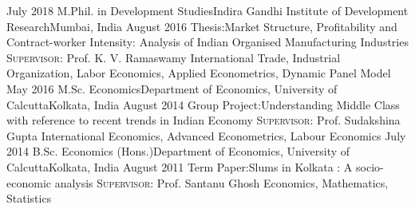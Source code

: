 %
%
%
\begin{experiences}
  \consultantexperience
  {July 2018}       {M.Phil. in Development Studies}{Indira Gandhi Institute of Development Research}{Mumbai, India}
  {August 2016}      {Thesis:}{Market Structure, Profitability and Contract-worker Intensity: Analysis of Indian Organised Manufacturing Industries}
                    {\textsc{Supervisor:} Prof. K. V. Ramaswamy
                    }
                    {International Trade, Industrial Organization, Labor Economics, Applied Econometrics, Dynamic Panel Model}
  \emptySeparator
  \consultantexperience
  {May 2016}      {M.Sc. Economics}{Department of Economics, University of Calcutta}{Kolkata, India}
  {August 2014}       {Group Project:}{Understanding Middle Class with reference to recent trends in Indian Economy}
                    {\textsc{Supervisor:} Prof. Sudakshina Gupta}
                    {International Economics, Advanced Econometrics, Labour Economics} 
  \emptySeparator   
  \consultantexperience
  {July 2014}    {B.Sc. Economics (Hons.)}{Department of Economics, University of Calcutta}{Kolkata, India}
  {August 2011}    {Term Paper:}{Slums in Kolkata : A socio-economic analysis}
                    {\textsc{Supervisor:} Prof. Santanu Ghosh
                    }
                    {Economics, Mathematics, Statistics}
\end{experiences}
